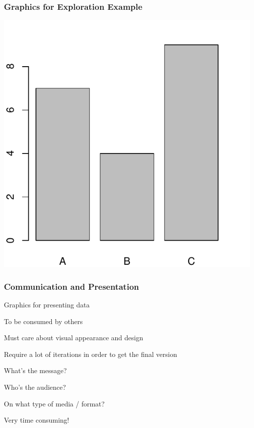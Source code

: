 \documentclass[12pt]{beamer}\usepackage[]{graphicx}\usepackage[]{color}
\newenvironment{knitrout}{}{} %
\begin{document}

\begin{frame}
\frametitle{Graphics for Exploration Example}

\begin{knitrout}
\color{fgcolor}

{\centering \includegraphics[width=.7\linewidth,height=.6\linewidth]{figure/unnamed-chunk-1-1} 

}



\end{knitrout}

\end{frame}


\begin{frame}
\frametitle{Communication and Presentation}

\bi
  \item Graphics for presenting data
  \item To be consumed by others
  \item Must care about visual appearance and design
  \item Require a lot of iterations in order to get the final version
  \item What's the message? 
  \item Who's the audience?
  \item On what type of media / format?
  \item Very time consuming!
\ei
\eb

\end{frame}
\end{document}
